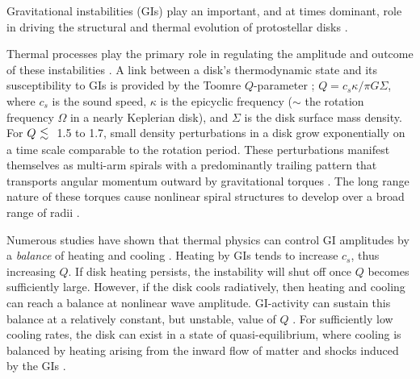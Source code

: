 \documentclass[manuscript]{aastex} %
\newcommand{\al}{\mbox{ \raisebox{-.8ex}{$\stackrel{\textstyle <}{\sim}$} }}
\begin{document}
Gravitational instabilities (GIs) play an important, and at times dominant, role in driving the structural and thermal
evolution of  protostellar disks \citep[for a review, see][]{durisen2005}.

 
Thermal processes play the primary role in regulating the amplitude and outcome of these instabilities \citep{pickett1998,pickett2000,mejia2005,nelson1998,nelson2000a}. A link between a disk's thermodynamic state and its susceptibility to GIs is provided by the Toomre $Q$-parameter \citep{toomre1981};  $Q = c_s \kappa / \pi G \Sigma$, where $c_s$ is the sound speed, $\kappa$ is the epicyclic frequency ($\sim$ the rotation frequency 
$\Omega$ in a nearly Keplerian disk), and $\Sigma$ is the disk surface mass density. For $Q \al$  1.5 to 1.7,  small density perturbations in a disk grow exponentially on a time scale comparable to the rotation period. These perturbations manifest themselves as multi-arm spirals with a predominantly trailing pattern that transports angular momentum outward by gravitational torques \citep[e.g.]{larson1984,boss1984,durisen1986,papaloizou1991, laughlin1994,nelson1998,pickett1998}. The long range nature of these torques cause nonlinear
spiral structures to develop over a broad range of radii \citep{laughlin1998,nelson1998,nelson2000a,pickett1998, pickett2000,pickett2003}.

Numerous studies have shown that thermal physics can control GI amplitudes by a {\it balance} of heating and cooling \citep[for example]{tomley1991,tomley1994,pickett1998,pickett2000, pickett2003,gammie2001,boss2002,rice2003b,mejia2005,boley2006,boley2007, stamatellos2008,cossins2009}.
Heating by GIs tends to increase $c_s$, thus increasing $Q$. If disk heating persists, the instability will shut off once $Q$ becomes sufficiently large.  However, if the disk cools radiatively, then heating and cooling can reach a balance at nonlinear wave amplitude. GI-activity can sustain this balance  at a relatively constant,
but unstable, value of $Q$ \citep{paczynski1978, lin1981,goldreich1965}.  
For sufficiently low cooling rates, the disk can exist in a state of quasi-equilibrium, where cooling is 
balanced by heating arising from the inward flow of matter and shocks induced by the GIs
\citep{gammie2001, lodato2004, rice2005, cossins2009, vorobyov2010}.
\end{document}
